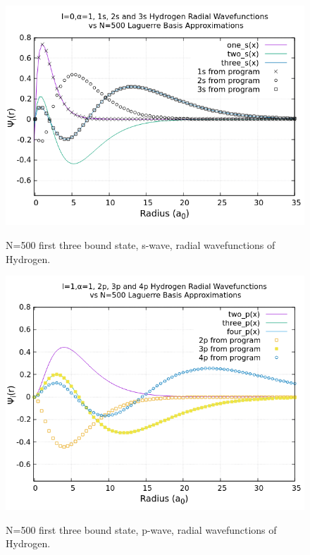 \documentclass{article}
\begin{document}
	\begin{figure}[H]
		\centering
		\includegraphics[scale=0.8]{Images/swave.png}\\
		\caption{N=500 first three bound state, s-wave, radial wavefunctions of Hydrogen.}
		\label{swave}
	\end{figure}
	\begin{figure}[H]
		\centering
		\includegraphics[scale=0.8]{Images/pwave.png}\\
		\caption{N=500 first three bound state, p-wave, radial wavefunctions of Hydrogen.}
		\label{pwave}
	\end{figure}
	
	
	
	
\end{document}
